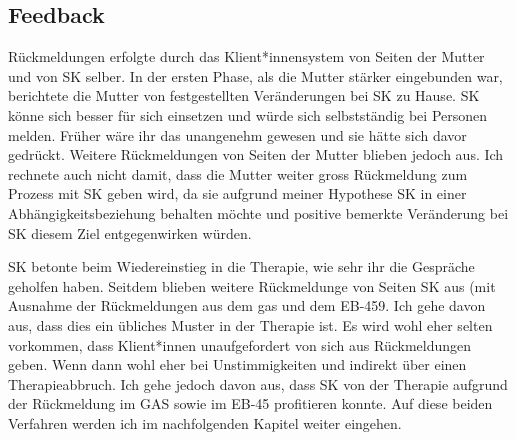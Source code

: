 \subsection{Feedback} 
Rückmeldungen erfolgte durch das Klient*innensystem von Seiten der Mutter und von SK selber. In der ersten Phase, als die Mutter stärker eingebunden war, berichtete die Mutter von festgestellten Veränderungen bei SK zu Hause. SK könne sich besser für sich einsetzen und würde sich selbstständig bei Personen melden. Früher wäre ihr das unangenehm gewesen und sie hätte sich davor gedrückt. Weitere Rückmeldungen von Seiten der Mutter blieben jedoch aus. Ich rechnete auch nicht damit, dass die Mutter weiter gross Rückmeldung zum Prozess mit SK geben wird, da sie aufgrund meiner Hypothese SK in einer Abhängigkeitsbeziehung behalten möchte und positive bemerkte Veränderung bei SK diesem Ziel entgegenwirken würden.

SK betonte beim Wiedereinstieg in die Therapie, wie sehr ihr die Gespräche geholfen haben. Seitdem blieben weitere Rückmeldunge von Seiten SK aus (mit Ausnahme der Rückmeldungen aus dem \ac{gas} und dem EB-459. Ich gehe davon aus, dass dies ein übliches Muster in der Therapie ist. Es wird wohl eher selten vorkommen, dass Klient*innen unaufgefordert von sich aus Rückmeldungen geben. Wenn dann wohl eher bei Unstimmigkeiten und indirekt über einen Therapieabbruch. Ich gehe jedoch davon aus, dass SK von der Therapie aufgrund der Rückmeldung im GAS sowie im EB-45 profitieren konnte. Auf diese beiden Verfahren werden ich im nachfolgenden Kapitel \textit{} weiter eingehen.



